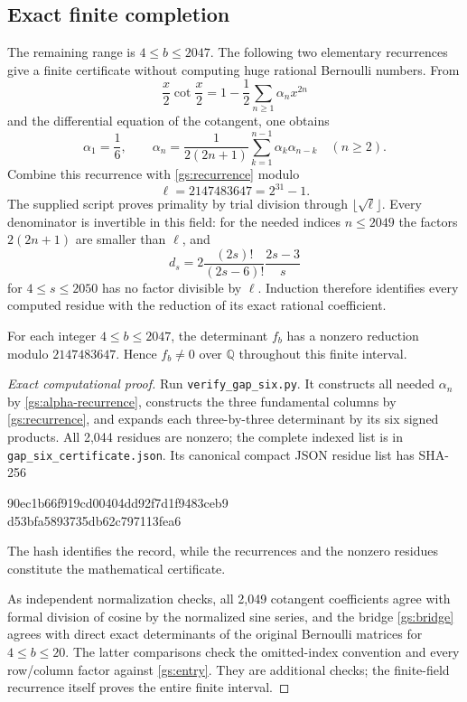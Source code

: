 \subsection{Exact finite completion}

The remaining range is $4\le b\le2047$.
The following two elementary recurrences give a finite certificate
without computing huge rational Bernoulli numbers.  From
\[
 \frac{x}{2}\cot\frac{x}{2}=1-\frac12\sum_{n\ge1}\alpha_nx^{2n}
\]
and the differential equation of the cotangent, one obtains
\begin{equation}\label{gs:alpha-recurrence}
 \alpha_1=\frac16,\qquad
 \alpha_n=\frac1{2(2n+1)}
       \sum_{k=1}^{n-1}\alpha_k\alpha_{n-k}\quad(n\ge2).
\end{equation}
Combine this recurrence with \eqref{gs:recurrence} modulo
\[
                         \ell=2147483647=2^{31}-1.
\]
The supplied script proves primality by trial division through
$\lfloor\sqrt\ell\rfloor$.  Every denominator is invertible in
this field: for the needed indices $n\le2049$ the factors
$2(2n+1)$ are smaller than $\ell$, and
\[
 d_s=2\frac{(2s)!}{(2s-6)!}\frac{2s-3}{s}
\]
for $4\le s\le2050$ has no factor divisible by $\ell$.
Induction therefore identifies every computed residue with the
reduction of its exact rational coefficient.

\begin{proposition}
\label{gs:finite}
For each integer $4\le b\le2047$, the determinant $f_b$ has a
nonzero reduction modulo $2147483647$.  Hence $f_b\ne0$ over
$\mathbb Q$ throughout this finite interval.
\end{proposition}

\begin{proof}[Exact computational proof]
Run \texttt{verify\_gap\_six.py}.  It constructs all needed
$\alpha_n$ by \eqref{gs:alpha-recurrence}, constructs the three
fundamental columns by \eqref{gs:recurrence}, and expands each
three-by-three determinant by its six signed products.  All 2,044
residues are nonzero; the complete indexed list is in
\texttt{gap\_six\_certificate.json}.  Its canonical compact JSON
residue list has SHA-256
\begin{center}\small\ttfamily
90ec1b66f919cd00404dd92f7d1f9483ceb9\\
d53bfa5893735db62c797113fea6
\end{center}
The hash identifies the record, while the recurrences and the nonzero
residues constitute the mathematical certificate.

As independent normalization checks, all 2,049 cotangent coefficients
agree with formal division of cosine by the normalized sine series,
and the bridge \eqref{gs:bridge} agrees with direct exact determinants
of the original Bernoulli matrices for $4\le b\le20$.  The latter
comparisons check the omitted-index convention and every row/column
factor against \eqref{gs:entry}.  They are additional checks; the
finite-field recurrence itself proves the entire finite interval.
\end{proof}

